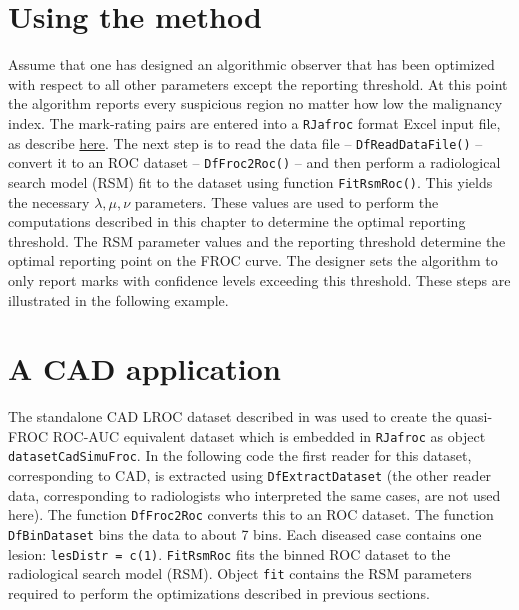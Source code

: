 \documentclass[
]{book}
\begin{document}
\hypertarget{optim-op-point-how-to-use-method}{%
\section{Using the method}\label{optim-op-point-how-to-use-method}}

Assume that one has designed an algorithmic observer that has been optimized with respect to all other parameters except the reporting threshold. At this point the algorithm reports every suspicious region no matter how low the malignancy index. The mark-rating pairs are entered into a \texttt{RJafroc} format Excel input file, as describe \href{https://dpc10ster.github.io/RJafrocQuickStart/quick-start-froc-data-format.html}{here}. The next step is to read the data file -- \texttt{DfReadDataFile()} -- convert it to an ROC dataset -- \texttt{DfFroc2Roc()} -- and then perform a radiological search model (RSM) fit to the dataset using function \texttt{FitRsmRoc()}. This yields the necessary \(\lambda, \mu, \nu\) parameters. These values are used to perform the computations described in this chapter to determine the optimal reporting threshold. The RSM parameter values and the reporting threshold determine the optimal reporting point on the FROC curve. The designer sets the algorithm to only report marks with confidence levels exceeding this threshold. These steps are illustrated in the following example.

\hypertarget{optim-op-point-application}{%
\section{A CAD application}\label{optim-op-point-application}}

The standalone CAD LROC dataset described in \citep{hupse2013standalone} was used to create the quasi-FROC ROC-AUC equivalent dataset which is embedded in \texttt{RJafroc} as object \texttt{datasetCadSimuFroc}. In the following code the first reader for this dataset, corresponding to CAD, is extracted using \texttt{DfExtractDataset} (the other reader data, corresponding to radiologists who interpreted the same cases, are not used here). The function \texttt{DfFroc2Roc} converts this to an ROC dataset. The function \texttt{DfBinDataset} bins the data to about 7 bins. Each diseased case contains one lesion: \texttt{lesDistr\ =\ c(1)}. \texttt{FitRsmRoc} fits the binned ROC dataset to the radiological search model (RSM). Object \texttt{fit} contains the RSM parameters required to perform the optimizations described in previous sections.
\end{document}
